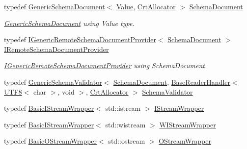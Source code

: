 \begin{DoxyCompactItemize}
typedef \mbox{\hyperlink{classrapidjson_1_1_generic_schema_document}{Generic\+Schema\+Document}}$<$ \mbox{\hyperlink{namespacerapidjson_aa65fc9fb381b2cbc54f98673eadd6505}{Value}}, \mbox{\hyperlink{classrapidjson_1_1_crt_allocator}{Crt\+Allocator}} $>$ \mbox{\hyperlink{namespacerapidjson_a52bbb5d64d1319495089e1713a0653cf}{Schema\+Document}}
\begin{DoxyCompactList}\small\item\em \mbox{\hyperlink{classrapidjson_1_1_generic_schema_document}{Generic\+Schema\+Document}} using Value type. \end{DoxyCompactList}\item 
typedef \mbox{\hyperlink{classrapidjson_1_1_i_generic_remote_schema_document_provider}{I\+Generic\+Remote\+Schema\+Document\+Provider}}$<$ \mbox{\hyperlink{namespacerapidjson_a52bbb5d64d1319495089e1713a0653cf}{Schema\+Document}} $>$ \mbox{\hyperlink{namespacerapidjson_af91eb8eea47b79d75b23e29fa9c0abb5}{I\+Remote\+Schema\+Document\+Provider}}
\begin{DoxyCompactList}\small\item\em \mbox{\hyperlink{classrapidjson_1_1_i_generic_remote_schema_document_provider}{I\+Generic\+Remote\+Schema\+Document\+Provider}} using Schema\+Document. \end{DoxyCompactList}\item 
typedef \mbox{\hyperlink{classrapidjson_1_1_generic_schema_validator}{Generic\+Schema\+Validator}}$<$ \mbox{\hyperlink{namespacerapidjson_a52bbb5d64d1319495089e1713a0653cf}{Schema\+Document}}, \mbox{\hyperlink{structrapidjson_1_1_base_reader_handler}{Base\+Reader\+Handler}}$<$ \mbox{\hyperlink{structrapidjson_1_1_u_t_f8}{U\+T\+F8}}$<$ char $>$, void $>$, \mbox{\hyperlink{classrapidjson_1_1_crt_allocator}{Crt\+Allocator}} $>$ \mbox{\hyperlink{namespacerapidjson_a38dbb50c156f67adc0a70548d5572ccf}{Schema\+Validator}}
\item 
typedef \mbox{\hyperlink{classrapidjson_1_1_basic_i_stream_wrapper}{Basic\+I\+Stream\+Wrapper}}$<$ std\+::istream $>$ \mbox{\hyperlink{namespacerapidjson_a4cb54f68bd71aed41b1b26137a7dab84}{I\+Stream\+Wrapper}}
\item 
typedef \mbox{\hyperlink{classrapidjson_1_1_basic_i_stream_wrapper}{Basic\+I\+Stream\+Wrapper}}$<$ std\+::wistream $>$ \mbox{\hyperlink{namespacerapidjson_a65a9e5d58bff23a6c446cc7722080320}{W\+I\+Stream\+Wrapper}}
\item 
typedef \mbox{\hyperlink{classrapidjson_1_1_basic_o_stream_wrapper}{Basic\+O\+Stream\+Wrapper}}$<$ std\+::ostream $>$ \mbox{\hyperlink{namespacerapidjson_a15f55e221e1d336afab91cc69c258187}{O\+Stream\+Wrapper}}

\end{DoxyCompactItemize}

